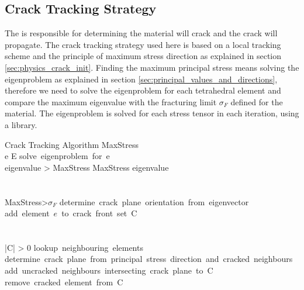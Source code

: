\subsection*{Crack Tracking Strategy}
\label{sec:crack_tracking_strategy}
The  is responsible for determining
 the material will crack and  the crack will
propagate. The crack tracking strategy used here is
based on a local tracking scheme and the principle of maximum stress
direction as explained in section
\vref{sec:physics_crack_init}. Finding the maximum principal stress
means 
solving the eigenproblem as explained in section
\ref{sec:principal_values_and_directions}, therefore we need to
solve the eigenproblem for each tetrahedral element and compare the
maximum eigenvalue with the fracturing limit $\sigma_F$ defined for the
material. The eigenproblem is solved for each stress tensor in each
iteration, using a library. \\

\begin{center} 
\begin{minipage}[b]{\linewidth} 
\begin{pseudocode}[ruled]{Crack Tracking Algorithm}{ }
\label{pc:crack}
MaxStress \\
\FOREACH e \in E \DO
\BEGIN
  \mbox{solve eigenproblem for e}\\
  \IF eigenvalue > MaxStress \THEN
  MaxStress \GETS eigenvalue \\
\END \\ \\

\IF MaxStress>\mbox{$\sigma_F$} \THEN
\BEGIN
 \mbox{determine crack plane orientation from eigenvector}\\
 \mbox{add element $e$ to crack front set C}\\
\END \\ \\

\WHILE |C| > 0 \DO
 \BEGIN
 \mbox{lookup neighbouring elements}\\
  \mbox{determine crack plane from principal stress direction and
    cracked neighbours}\\
  \mbox{add uncracked neighbours intersecting crack plane to C} \\
  \mbox{remove cracked element from C}\\
  \END
\end{pseudocode} 
\end{minipage} 
\end{center} 

